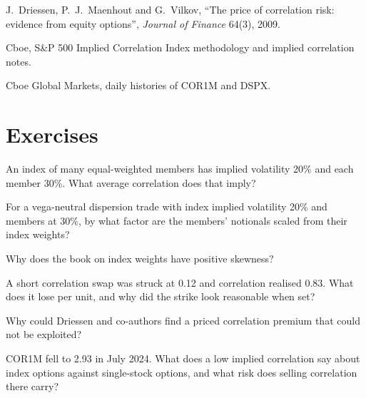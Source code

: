 \begin{omsources}
\item J.~Driessen, P.~J.~Maenhout and G.~Vilkov, ``The price of correlation risk: evidence from equity options'', \emph{Journal of Finance} 64(3), 2009.
\item Cboe, S\&P 500 Implied Correlation Index methodology and implied correlation notes.
\item Cboe Global Markets, daily histories of COR1M and DSPX.
\end{omsources}

\section{Exercises}

\begin{exercise}[$\star$]\label{exo:s2:dispersion-and-correlation:1}
An index of many equal-weighted members has implied volatility 20\% and each member 30\%. What average correlation does that imply?
\end{exercise}

\begin{exercise}[$\star$]\label{exo:s2:dispersion-and-correlation:2}
For a vega-neutral dispersion trade with index implied volatility 20\% and members at 30\%, by what factor are the members' notionals scaled from
their index weights?
\end{exercise}

\begin{exercise}[$\star$]\label{exo:s2:dispersion-and-correlation:3}
Why does the book on index weights have positive skewness?
\end{exercise}

\begin{exercise}[$\star\star$]\label{exo:s2:dispersion-and-correlation:4}
A short correlation swap was struck at 0.12 and correlation realised 0.83. What does it lose per unit, and why did the strike look reasonable when set?
\end{exercise}

\begin{exercise}[$\star\star$]\label{exo:s2:dispersion-and-correlation:5}
Why could Driessen and co-authors find a priced correlation premium that could not be exploited?
\end{exercise}

\begin{exercise}[$\star\star$]\label{exo:s2:dispersion-and-correlation:6}
COR1M fell to 2.93 in July 2024. What does a low implied correlation say about index options against single-stock options, and what risk does
selling correlation there carry?
\end{exercise}

